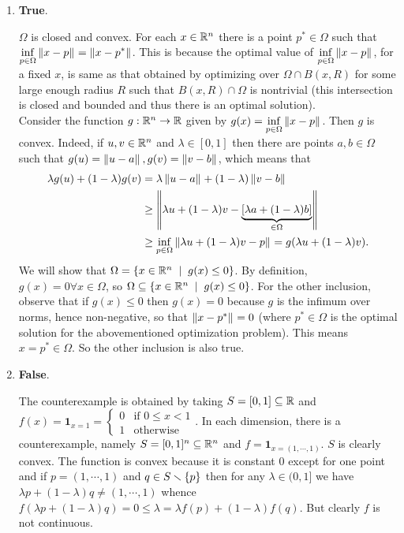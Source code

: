 \begin{enumerate}[leftmargin=*]
\item \textbf{True}.

$\Omega$ is closed and convex. For each $x\in \mathbb{R}^{n}$ there is a point $p^{*}\in \Omega$ such that $\displaystyle\inf_{p\in \Omega} \left\lVert x-p \right\rVert_{} = \left\lVert x-p^{*} \right\rVert_{}$. This is because the optimal value of $\displaystyle\inf_{p\in \Omega} \left\lVert x-p \right\rVert_{}$, for a fixed $x$, is same as that obtained by optimizing over $\Omega\cap B(x,R)$ for some large enough radius $R$ such that $B(x,R)\cap \Omega$ is nontrivial (this intersection is closed and bounded and thus there is an optimal solution). \\
Consider the function $g:\mathbb{R}^{n}\to \mathbb{R}$ given by $g(x) = \displaystyle\inf_{p\in \Omega}\left\lVert x-p \right\rVert_{}$. Then $g$ is convex. Indeed, if $u,v\in \mathbb{R}^{n}$ and $\lambda\in[0,1]$ then there are points $a,b\in \Omega$ such that $g(u) = \left\lVert u-a \right\rVert_{}, g(v) = \left\lVert v-b \right\rVert_{}$, which means that \begin{align*}
\lambda g(u) + (1-\lambda)g(v) &= \lambda\left\lVert u-a \right\rVert_{} + (1-\lambda)\left\lVert v-b \right\rVert_{} \\
&\ge \left\lVert \lambda u + (1-\lambda)v - \underbrace{\left[\lambda a + (1-\lambda)b \right]}_{\in \Omega} \right\rVert_{} \\
&\ge \displaystyle\inf_{p\in \Omega}\left\lVert \lambda u + (1-\lambda)v-p \right\rVert_{} = g(\lambda u + (1-\lambda)v).
\end{align*}
We will show that $\Omega = \set{x\in\R^{n}\st g(x)\le 0}$. By definition, $g(x) = 0\forall x\in\Omega$, so $\Omega\subseteq \set{x\in\R^{n}\st g(x)\le 0}$. For the other inclusion, observe that if $g(x)\le 0$ then $g(x)=0$ because $g$ is the infimum over norms, hence non-negative, so that $\left\lVert x-p^{*} \right\rVert_{} = 0$ (where $p^{*}\in\Omega$ is the optimal solution for the abovementioned optimization problem). This means $x=p^{*}\in \Omega$. So the other inclusion is also true.


\item \textbf{False}.

The counterexample is obtained by taking $S=[0,1]\subseteq \mathbb{R}$ and $f(x) = \pmb 1_{x=1} = \begin{cases}
0 & \text{if } 0\leq x < 1\\
1 & \text{otherwise}
\end{cases}$. In each dimension, there is a counterexample, namely $S=[0,1]^{n}\subseteq\mathbb{R}^{n}$ and $f=\pmb 1_{x=(1,\cdots,1)}$. $S$ is clearly convex. The function is convex because it is constant $0$ except for one point and if $p=(1,\cdots,1)$ and $q\in S\smallsetminus \left\{p\right\}$ then for any $\lambda\in(0,1]$ we have $\lambda p + (1-\lambda)q\neq (1,\cdots,1)$ whence $f(\lambda p + (1-\lambda)q) = 0 \leq \lambda = \lambda f(p) + (1-\lambda)f(q)$. But clearly $f$ is not continuous.


\end{enumerate}
